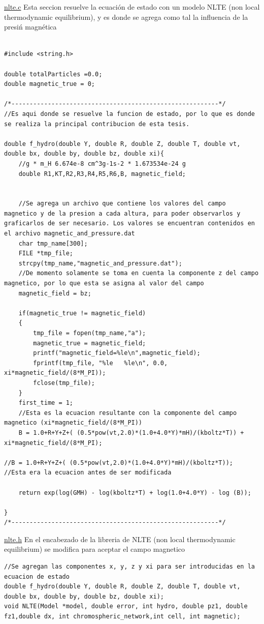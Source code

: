 \documentclass[9pt]{book}
\begin{document}
\underline{nlte.c}
Esta seccion resuelve la ecuaci\'on de estado con un modelo NLTE (non local thermodynamic equilibrium), y es donde se agrega como tal la influencia de la presi\'n magn\'etica
\begin{lstlisting}[style=CStyle]

#include <string.h>

double totalParticles =0.0;
double magnetic_true = 0;

/*---------------------------------------------------------*/
//Es aqui donde se resuelve la funcion de estado, por lo que es donde se realiza la principal contribucion de esta tesis.

double f_hydro(double Y, double R, double Z, double T, double vt, double bx, double by, double bz, double xi){
	//g * m_H 6.674e-8 cm^3g-1s-2 * 1.673534e-24 g
	double R1,KT,R2,R3,R4,R5,R6,B, magnetic_field;


	//Se agrega un archivo que contiene los valores del campo magnetico y de la presion a cada altura, para poder observarlos y graficarlos de ser necesario. Los valores se encuentran contenidos en el archivo magnetic_and_pressure.dat
	char tmp_name[300];
	FILE *tmp_file;
	strcpy(tmp_name,"magnetic_and_pressure.dat");
	//De momento solamente se toma en cuenta la componente z del campo magnetico, por lo que esta se asigna al valor del campo
	magnetic_field = bz;

	if(magnetic_true != magnetic_field)
	{
		tmp_file = fopen(tmp_name,"a");
		magnetic_true = magnetic_field;
		printf("magnetic_field=%le\n",magnetic_field);
		fprintf(tmp_file, "%le   %le\n", 0.0, xi*magnetic_field/(8*M_PI));
		fclose(tmp_file);
	}
	first_time = 1;
	//Esta es la ecuacion resultante con la componente del campo magnetico (xi*magnetic_field/(8*M_PI))
	B = 1.0+R+Y+Z+( (0.5*pow(vt,2.0)*(1.0+4.0*Y)*mH)/(kboltz*T)) + xi*magnetic_field/(8*M_PI);

//B = 1.0+R+Y+Z+( (0.5*pow(vt,2.0)*(1.0+4.0*Y)*mH)/(kboltz*T));
//Esta era la ecuacion antes de ser modificada

	return exp(log(GMH) - log(kboltz*T) + log(1.0+4.0*Y) - log (B));

}
/*---------------------------------------------------------*/

\end{lstlisting}

\underline{nlte.h}
En el encabezado de la libreria de NLTE (non local thermodynamic equilibrium) se modifica para aceptar el campo magnetico
\begin{lstlisting}[style=CStyle]
//Se agregan las componentes x, y, z y xi para ser introducidas en la ecuacion de estado
double f_hydro(double Y, double R, double Z, double T, double vt, double bx, double by, double bz, double xi);
void NLTE(Model *model, double error, int hydro, double pz1, double fz1,double dx, int chromospheric_network,int cell, int magnetic);
\end{lstlisting}
\end{document}
